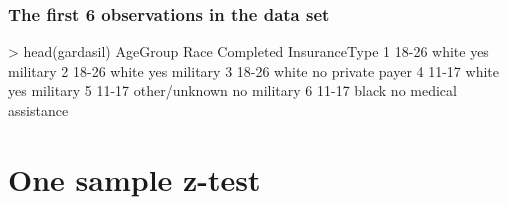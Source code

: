\begin{frame}[fragile]
\frametitle{The first 6 observations in the data set}
\begin{lcverbatim}
> head(gardasil)
  AgeGroup          Race Completed      InsuranceType
1    18-26         white       yes           military
2    18-26         white       yes           military
3    18-26         white        no      private payer
4    11-17         white       yes           military
5    11-17 other/unknown        no           military
6    11-17         black        no medical assistance
\end{lcverbatim}
\end{frame}




\section[One sample z-test]{One sample z-test}
\begin{frame}
\end{frame}

